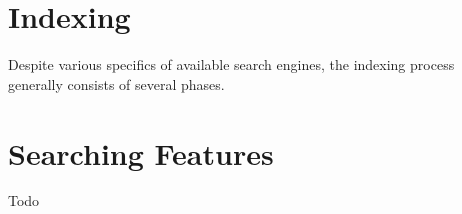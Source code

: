 %

%


\section{Indexing}

Despite various specifics of available search engines, the indexing process generally consists of several phases.
\cite{Fox:1991:FFA:903195}


\section{Searching Features}

Todo

